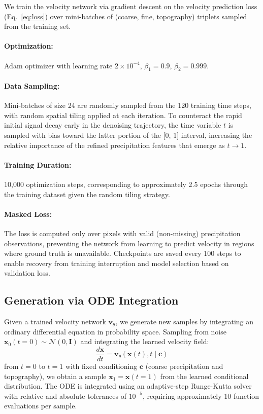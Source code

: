 \documentclass[11pt]{article}
\begin{document}
We train the velocity network via gradient descent on the velocity prediction loss (Eq.~\ref{eq:loss}) over mini-batches of (coarse, fine, topography) triplets sampled from the training set. 

\paragraph{Optimization:} Adam optimizer with learning rate $2 \times 10^{-4}$, $\beta_1 = 0.9$, $\beta_2 = 0.999$.
    
\paragraph{Data Sampling:} Mini-batches of size 24 are randomly sampled from the 120 training time steps, with random spatial tiling applied at each iteration. To counteract the rapid initial signal decay early in the denoising trajectory, the time variable $t$ is sampled with bias toward the latter portion of the [0, 1] interval, increasing the relative importance of the refined precipitation features that emerge as $t \to 1$.
    
\paragraph{Training Duration:} 10,000 optimization steps, corresponding to approximately 2.5 epochs through the training dataset given the random tiling strategy.
    
\paragraph{Masked Loss:} The loss is computed only over pixels with valid (non-missing) precipitation observations, preventing the network from learning to predict velocity in regions where ground truth is unavailable. Checkpoints are saved every 100 steps to enable recovery from training interruption and model selection based on validation loss.
    

\subsection{Generation via ODE Integration}
    
Given a trained velocity network $\mathbf{v}_\theta$, we generate new samples by integrating an ordinary differential equation in probability space. Sampling from noise $\mathbf{x}_0(t=0) \sim \mathcal{N}(0, \mathbf{I})$ and integrating the learned velocity field:
$$\frac{d\mathbf{x}}{dt} = \mathbf{v}_\theta(\mathbf{x}(t), t \mid \mathbf{c})$$
from $t=0$ to $t=1$ with fixed conditioning $\mathbf{c}$ (coarse precipitation and topography), we obtain a sample $\mathbf{x}_1 = \mathbf{x}(t=1)$ from the learned conditional distribution. The ODE is integrated using an adaptive-step Runge-Kutta solver \citep[DOPRI5;][]{dormand1980} with relative and absolute tolerances of $10^{-5}$, requiring approximately 10 function evaluations per sample.
\end{document}
